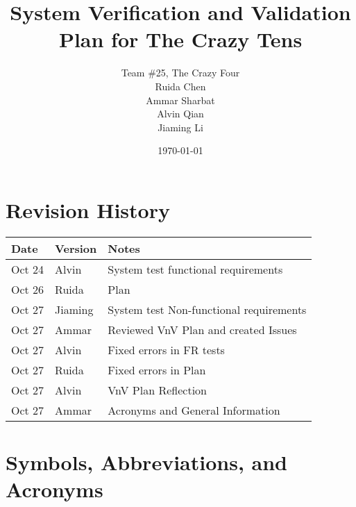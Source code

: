 \documentclass[12pt, titlepage]{article}
\begin{document}
\title{System Verification and Validation Plan for The Crazy Tens} 
\author{
    Team \#25, The Crazy Four \\[1ex]
    Ruida Chen \\
    Ammar Sharbat \\
    Alvin Qian \\
    Jiaming Li
}
\date{\today}
	
\maketitle


\section*{Revision History}

\begin{tabularx}{\textwidth}{p{3cm}p{2cm}X}
\toprule {\bf Date} & {\bf Version} & {\bf Notes}\\
\midrule
Oct 24 & Alvin & System test functional requirements\\
Oct 26 & Ruida & Plan\\
Oct 27 & Jiaming & System test Non-functional requirements\\
Oct 27 & Ammar & Reviewed VnV Plan and created Issues \\
Oct 27 & Alvin & Fixed errors in FR tests\\
Oct 27 & Ruida & Fixed errors in Plan \\
Oct 27 & Alvin & VnV Plan Reflection \\
Oct 27 & Ammar & Acronyms and General Information \\
\bottomrule
\end{tabularx}


\newpage

\tableofcontents


\section{Symbols, Abbreviations, and Acronyms}
\end{document}
